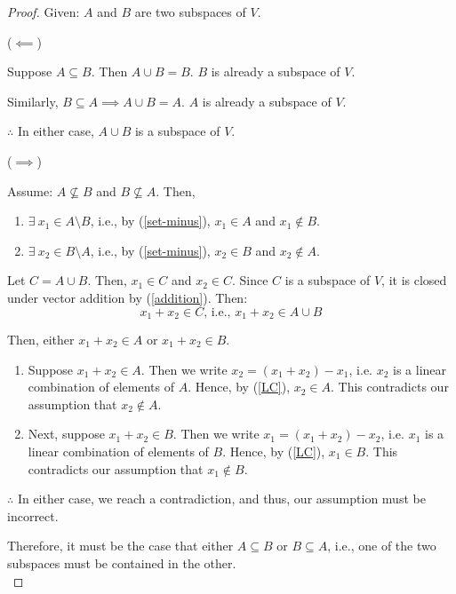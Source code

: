 \documentclass{article}
\newcommand{\diff}[2]{#1 \setminus #2}
\begin{document}
    \begin{proof}
        Given: $A$ and $B$ are two subspaces of $V$.

        ($\impliedby$)

        Suppose $A \subseteq B$. Then $A \cup B = B$. $B$ is already a subspace of $V$.

        Similarly, $B \subseteq A \implies A \cup B = A$. $A$ is already a subspace of $V$.

        $\therefore$ In either case, $A \cup B$ is a subspace of $V$.

        ($\implies$)

        Assume: $A \nsubseteq B$ and $B \nsubseteq A$. Then,
        \begin{enumerate}[label=(\alph*), leftmargin=0.5in]
            \item $\exists\ x_1 \in \diff{A}{B}$, i.e., by (\ref{set-minus}), $x_1 \in A$ and $x_1 \notin B$.
            \item $\exists\ x_2 \in \diff{B}{A}$, i.e., by (\ref{set-minus}), $x_2 \in B$ and $x_2 \notin A$.
        \end{enumerate}

        Let $C = A \cup B$. Then, $x_1 \in C$ and $x_2 \in C$. Since $C$ is a subspace of $V$, it is closed under vector addition by (\ref{addition}). Then:
        \begin{equation}
            \label{proof-1} x_1 + x_2 \in C \text{, i.e., } x_1 + x_2 \in A \cup B
        \end{equation}

        Then, either $x_1 + x_2 \in A$ or $x_1 + x_2 \in B$.

        \begin{enumerate}[label=(\alph*), leftmargin=0.5in]
            \item
            Suppose $x_1 + x_2 \in A$. Then we write $x_2 = (x_1 + x_2) - x_1$, i.e. $x_2$ is a linear combination of elements of $A$. Hence, by (\ref{LC}), $x_2 \in A$.
            This contradicts our assumption that $x_2 \notin A$.

            \item
            Next, suppose $x_1 + x_2 \in B$. Then we write $x_1 = (x_1 + x_2) - x_2$, i.e. $x_1$ is a linear combination of elements of $B$. Hence, by (\ref{LC}), $x_1 \in B$.
            This contradicts our assumption that $x_1 \notin B$.
        \end{enumerate}
        $\therefore$ In either case, we reach a contradiction, and thus, our assumption must be incorrect.

        Therefore, it must be the case that either $A \subseteq B$ or $B \subseteq A$, i.e., one of the two subspaces must be contained in the other. \\
    \end{proof}
\end{document}
